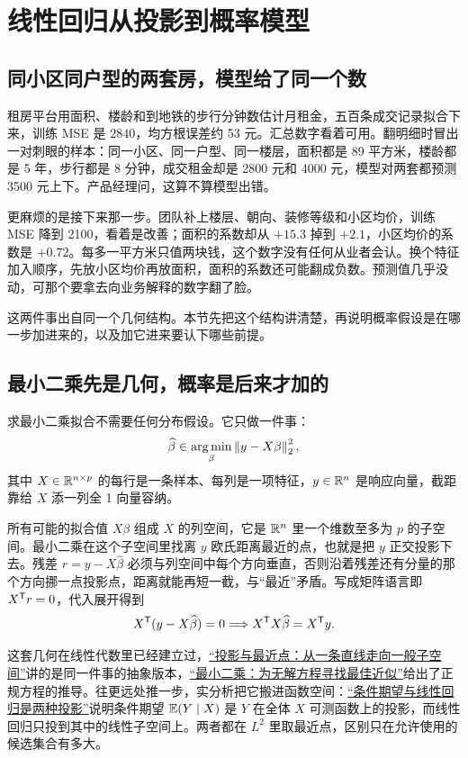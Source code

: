 \section{线性回归从投影到概率模型}
\label{sec:13-Machine-Learning/02-Linear-Models/01}

\subsection{同小区同户型的两套房，模型给了同一个数}

租房平台用面积、楼龄和到地铁的步行分钟数估计月租金，五百条成交记录拟合下来，训练 MSE 是 \(2840\)，均方根误差约 53 元。汇总数字看着可用。翻明细时冒出一对刺眼的样本：同一小区、同一户型、同一楼层，面积都是 89 平方米，楼龄都是 5 年，步行都是 8 分钟，成交租金却是 2800 元和 4000 元，模型对两套都预测 3500 元上下。产品经理问，这算不算模型出错。

更麻烦的是接下来那一步。团队补上楼层、朝向、装修等级和小区均价，训练 MSE 降到 2100，看着是改善；面积的系数却从 \(+15.3\) 掉到 \(+2.1\)，小区均价的系数是 \(+0.72\)。每多一平方米只值两块钱，这个数字没有任何从业者会认。换个特征加入顺序，先放小区均价再放面积，面积的系数还可能翻成负数。预测值几乎没动，可那个要拿去向业务解释的数字翻了脸。

这两件事出自同一个几何结构。本节先把这个结构讲清楚，再说明概率假设是在哪一步加进来的，以及加它进来要认下哪些前提。

\subsection{最小二乘先是几何，概率是后来才加的}

求最小二乘拟合不需要任何分布假设。它只做一件事：
\[
\widehat\beta\in\operatorname*{arg\,min}_\beta\left\lVert y-X\beta\right\rVert_2^2,
\]
其中 \(X\in\mathbb{R}^{n\times p}\) 的每行是一条样本、每列是一项特征，\(y\in\mathbb{R}^n\) 是响应向量，截距靠给 \(X\) 添一列全 1 向量容纳。

所有可能的拟合值 \(X\beta\) 组成 \(X\) 的列空间，它是 \(\mathbb{R}^n\) 里一个维数至多为 \(p\) 的子空间。最小二乘在这个子空间里找离 \(y\) 欧氏距离最近的点，也就是把 \(y\) 正交投影下去。残差 \(r=y-X\widehat\beta\) 必须与列空间中每个方向垂直，否则沿着残差还有分量的那个方向挪一点投影点，距离就能再短一截，与``最近''矛盾。写成矩阵语言即 \(X^{\mathsf{T}}r=0\)，代入展开得到
\[
X^{\mathsf{T}}(y-X\widehat\beta)=0
\space\Longrightarrow\space
X^{\mathsf{T}}X\widehat\beta=X^{\mathsf{T}}y.
\]

这套几何在线性代数里已经建立过，\hyperref[sec:03-Linear-Algebra/03-Orthogonality/02]{``投影与最近点：从一条直线走向一般子空间''}讲的是同一件事的抽象版本，\hyperref[sec:03-Linear-Algebra/03-Orthogonality/03]{``最小二乘：为无解方程寻找最佳近似''}给出了正规方程的推导。往更远处推一步，实分析把它搬进函数空间：\hyperref[sec:12-Real-Analysis-Support/07-Lp-Spaces-and-Function-Geometry/04]{``条件期望与线性回归是两种投影''}说明条件期望 \(\mathbb{E}(Y\mid X)\) 是 \(Y\) 在全体 \(X\) 可测函数上的投影，而线性回归只投到其中的线性子空间上。两者都在 \(L^2\) 里取最近点，区别只在允许使用的候选集合有多大。

